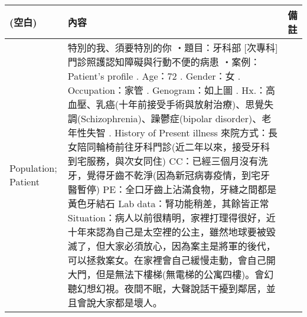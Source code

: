 \documentclass[12pt, a4paper]{article}
\begin{document}
\begin{xltabular}{1.0\linewidth}[c]{|p{2.3cm}|p{12.4cm}|l|} %
\caption{}
\label{tab:my-table}\\
\hline
(空白) &
  內容 &
  備註 \\ \hline
\endfirsthead
%
%
Population; Patient &
  特別的我、須要特別的你\newline
  ‧題目：牙科部 [次專科] 門診照護認知障礙與行動不便的病患\newline 
  ‧案例：Patient's profile . Age：72 . Gender：女 . Occupation：家管 . Genogram：如上圖 . Hx.：高血壓、乳癌(十年前接受手術與放射治療)、思覺失調(Schizophrenia)、躁鬱症(bipolar disorder)、老年性失智 . History of Present illness  \newline 
     來院方式：長女陪同輪椅前往牙科門診(近二年以來，接受牙科到宅服務，與次女同住)  \newline 
     CC：已經三個月沒有洗牙，覺得牙齒不乾淨(因為新冠病毐疫情，到宅牙醫暫停) \newline 
     PE：全口牙齒上沾滿食物，牙縫之間都是黃色牙結石  \newline 
     Lab data：腎功能稍差，其餘皆正常  \newline 
     Situation：病人以前很精明，家裡打理得很好，近十年來認為自己是太空裡的公主，雖然地球要被毀滅了，但大家必須放心，因為案主是將軍的後代，可以拯救案女。在家裡會自己緩慢走動，會自己開大門，但是無法下樓梯(無電梯的公寓四樓)。會幻聽幻想幻視。夜間不眠，大聲說話干擾到鄰居，並且會說大家都是壞人。\newline 
   &
  \\  \hline

\end{xltabular}
\end{document}
